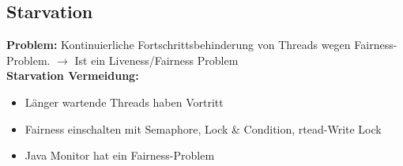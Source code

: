\subsection{Starvation}
\textcolor{b}{\textbf{Problem:}} Kontinuierliche Fortschrittsbehinderung von Threads wegen Fairness-Problem. $\rightarrow$ Ist ein Liveness/Fairness Problem\\
\textcolor{b}{\textbf{Starvation Vermeidung:}}
\begin{itemize}[topsep=0pt, leftmargin=3mm]
    \setlength\itemsep{-0.3em}
    \item Länger wartende Threads haben Vortritt
    \item Fairness einschalten mit \textcolor{b}{Semaphore, Lock \& Condition, rtead-Write Lock}
    \item Java Monitor hat ein Fairness-Problem
\end{itemize}